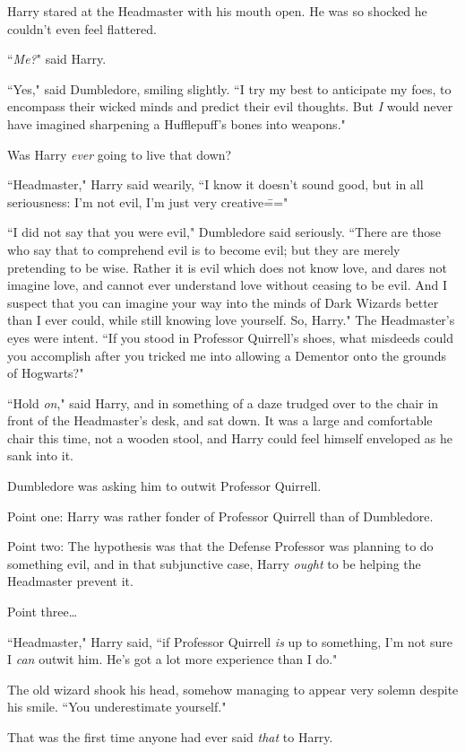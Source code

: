 Harry stared at the Headmaster with his mouth open. He was so shocked he couldn't even feel flattered.

``\emph{Me?}" said Harry.

``Yes," said Dumbledore, smiling slightly. ``I try my best to anticipate my foes, to encompass their wicked minds and predict their evil thoughts. But \emph{I} would never have imagined sharpening a Hufflepuff's bones into weapons."

Was Harry \emph{ever} going to live that down?

``Headmaster," Harry said wearily, ``I know it doesn't sound good, but in all seriousness: I'm not evil, I'm just very creative\==="

``I did not say that you were evil," Dumbledore said seriously. ``There are those who say that to comprehend evil is to become evil; but they are merely pretending to be wise. Rather it is evil which does not know love, and dares not imagine love, and cannot ever understand love without ceasing to be evil. And I suspect that you can imagine your way into the minds of Dark Wizards better than I ever could, while still knowing love yourself. So, Harry." The Headmaster's eyes were intent. ``If you stood in Professor Quirrell's shoes, what misdeeds could you accomplish after you tricked me into allowing a Dementor onto the grounds of Hogwarts?"

``Hold \emph{on}," said Harry, and in something of a daze trudged over to the chair in front of the Headmaster's desk, and sat down. It was a large and comfortable chair this time, not a wooden stool, and Harry could feel himself enveloped as he sank into it.

Dumbledore was asking him to outwit Professor Quirrell.

Point one: Harry was rather fonder of Professor Quirrell than of Dumbledore.

Point two: The hypothesis was that the Defense Professor was planning to do something evil, and in that subjunctive case, Harry \emph{ought} to be helping the Headmaster prevent it.

Point three{\ldots}

``Headmaster," Harry said, ``if Professor Quirrell \emph{is} up to something, I'm not sure I \emph{can} outwit him. He's got a lot more experience than I do."

The old wizard shook his head, somehow managing to appear very solemn despite his smile. ``You underestimate yourself."

That was the first time anyone had ever said \emph{that} to Harry.

